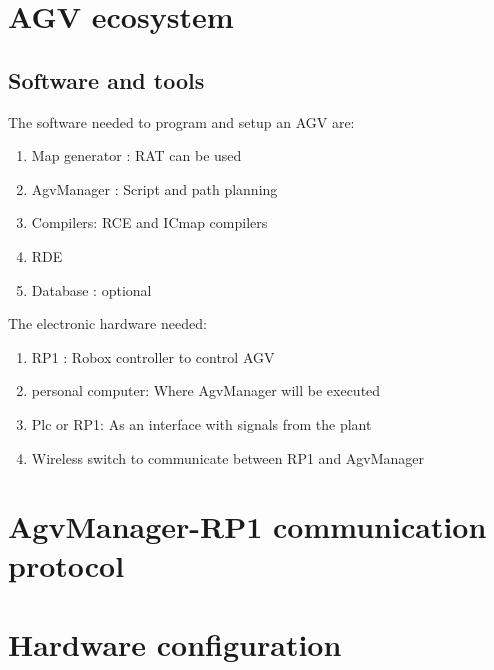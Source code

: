 %
\section{AGV ecosystem}

%
\subsection{Software and tools}
The software needed to program and setup an AGV are:
\begin{enumerate}
	\item Map generator : RAT can be used
	\item AgvManager : Script and path planning
	\item Compilers: RCE and ICmap compilers
	\item RDE
	\item Database : optional \\
\end{enumerate}

The electronic hardware needed:
\begin{enumerate}
	\item RP1 : Robox controller to control AGV
	\item personal computer: Where AgvManager will be executed
	\item Plc or RP1: As an interface with signals from the plant
	\item Wireless switch to communicate between RP1 and AgvManager
\end{enumerate}

%
\section{AgvManager-RP1 communication protocol}


%
\section{Hardware configuration}

%
